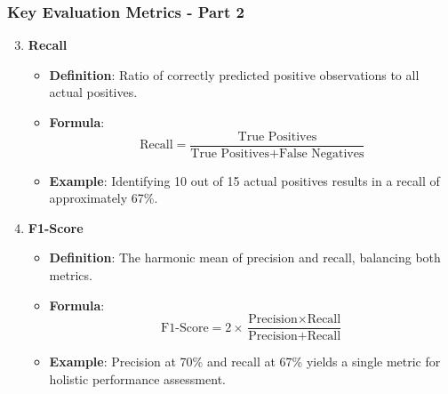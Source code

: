 \documentclass[aspectratio=169]{beamer}
\begin{document}
\begin{frame}[fragile]
    \frametitle{Key Evaluation Metrics - Part 2}
    \begin{enumerate}
        \setcounter{enumi}{2}
        \item \textbf{Recall}
        \begin{itemize}
            \item \textbf{Definition}: Ratio of correctly predicted positive observations to all actual positives.
            \item \textbf{Formula}:
            \begin{equation}
                \text{Recall} = \frac{\text{True Positives}}{\text{True Positives} + \text{False Negatives}}
            \end{equation}
            \item \textbf{Example}: Identifying 10 out of 15 actual positives results in a recall of approximately 67\%.
        \end{itemize}

        \item \textbf{F1-Score}
        \begin{itemize}
            \item \textbf{Definition}: The harmonic mean of precision and recall, balancing both metrics.
            \item \textbf{Formula}:
            \begin{equation}
                \text{F1-Score} = 2 \times \frac{\text{Precision} \times \text{Recall}}{\text{Precision} + \text{Recall}}
            \end{equation}
            \item \textbf{Example}: Precision at 70\% and recall at 67\% yields a single metric for holistic performance assessment.
        \end{itemize}
    \end{enumerate}
\end{frame}
\end{document}
